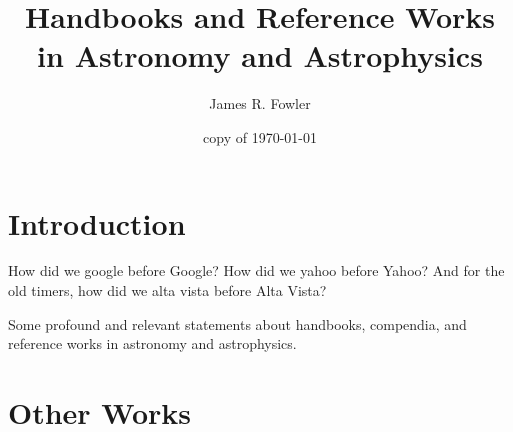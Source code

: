 \documentclass{article}
\begin{document}
\title{Handbooks and Reference Works in Astronomy and Astrophysics}
\author{James R. Fowler}
\date{copy of \today}

\maketitle


\section{Introduction}

How did we google before Google\texttrademark? How did we yahoo before Yahoo\texttrademark? And for
the old timers, how did we alta vista before Alta Vista\texttrademark?

Some profound and relevant statements about handbooks, compendia, and reference
works in  astronomy and astrophysics.

\section{Other Works}
\end{document}
